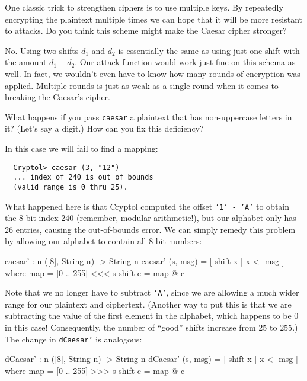 \begin{Exercise}\label{ex:caesar:4}
  One classic trick to strengthen ciphers is to use multiple keys. By
  repeatedly encrypting the plaintext multiple times we can hope that
  it will be more resistant to attacks. Do you think this scheme might
  make the Caesar cipher stronger?
\end{Exercise}
\begin{Answer}
  No. Using two shifts $d_1$ and $d_2$ is essentially the same as
  using just one shift with the amount $d_1 + d_2$. Our attack
  function would work just fine on this schema as well. In fact, we
  wouldn't even have to know how many rounds of encryption was
  applied. Multiple rounds is just as weak as a single round when it
  comes to breaking the Caesar's cipher.  \end{Answer}

\begin{Exercise}\label{ex:caesar:5}
  What happens if you pass {\tt caesar} a plaintext that has
  non-uppercase letters in it? (Let's say a digit.) How can you fix
  this deficiency?
\end{Exercise}
\begin{Answer}
In this case we will fail to find a mapping:
\begin{Verbatim}
  Cryptol> caesar (3, "12")
  ... index of 240 is out of bounds
  (valid range is 0 thru 25).
\end{Verbatim}
What happened here is that Cryptol computed the offset {\tt '1' - 'A'}
to obtain the $8$-bit index $240$ (remember, modular arithmetic!), but
our alphabet only has $26$ entries, causing the out-of-bounds error.
  We can simply remedy this problem by allowing our alphabet
to contain all $8$-bit numbers:\indRotLeft
\begin{code}
  caesar' : {n} ([8], String n) -> String n
  caesar' (s, msg) = [ shift x | x <- msg ]
    where map     = [0 .. 255] <<< s
          shift c = map @ c
\end{code}
Note that we no longer have to subtract {\tt 'A'}, since we are
allowing a much wider range for our plaintext and ciphertext. (Another
way to put this is that we are subtracting the value of the first
element in the alphabet, which happens to be 0 in this case!
Consequently, the number of ``good'' shifts increase from $25$ to
$255$.)  The change in {\tt dCaesar'} is analogous:\indRotRight
\begin{code}
  dCaesar' : {n} ([8], String n) -> String n
  dCaesar' (s, msg) = [ shift x | x <- msg ]
    where  map     = [0 .. 255] >>> s
           shift c = map @ c
\end{code}
\end{Answer}

